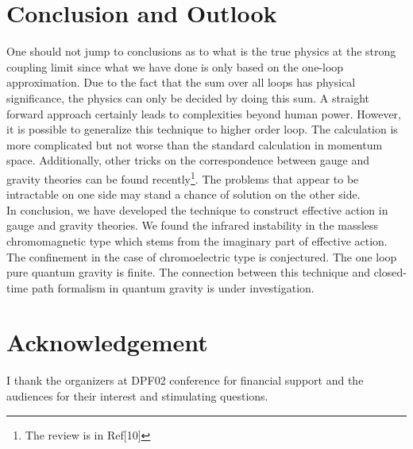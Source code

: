 \documentclass[a4paper,12 pt]{article}
\begin{document}
\section{Conclusion and Outlook}
One should not jump to conclusions as to what is the true physics
at the strong coupling limit since what we have done is only based
on the one-loop approximation. Due to the fact that the sum over
all loops has physical significance, the physics can only be
decided by doing this sum. A straight forward approach certainly
leads to complexities beyond human power. However, it is possible
to generalize this technique to higher order loop. The calculation
is more complicated but not worse than the standard calculation in
momentum space. Additionally, other tricks on the correspondence
between gauge and gravity theories can be found
recently\footnote{The review is in Ref[10]}. The problems that
appear to be intractable on one side may stand a
chance of solution on the other side.  \\

In conclusion, we have developed the technique to construct
effective action in gauge and gravity theories. We found the
infrared instability in the massless chromomagnetic type which
stems from the imaginary part of effective action. The confinement
in the case of chromoelectric type is conjectured. The one loop
pure quantum gravity is finite. The connection between this
technique and closed-time path formalism in quantum gravity is
under investigation.






\section{Acknowledgement}
I thank the organizers at DPF02 conference for financial support
and the audiences for their interest and stimulating questions.
\end{document}
